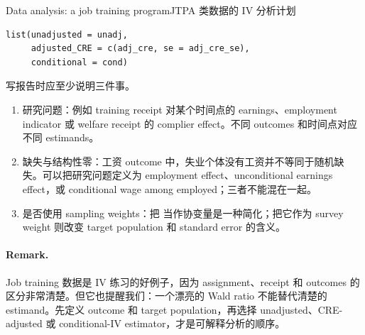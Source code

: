 \begin{exercisesolution}{Data analysis: a job training program}{JTPA 类数据的 IV 分析计划}
\begin{lstlisting}
list(unadjusted = unadj,
     adjusted_CRE = c(adj_cre, se = adj_cre_se),
     conditional = cond)
\end{lstlisting}

写报告时应至少说明三件事。
\begin{enumerate}
\item
研究问题：例如 training receipt 对某个时间点的 earnings、employment indicator 或 welfare receipt 的 complier effect。不同 outcomes 和时间点对应不同 estimands。
\item
缺失与结构性零：工资 outcome 中，失业个体没有工资并不等同于随机缺失。可以把研究问题定义为 employment effect、unconditional earnings effect，或 conditional wage among employed；三者不能混在一起。
\item
是否使用 sampling weights：把  当作协变量是一种简化；把它作为 survey weight 则改变 target population 和 standard error 的含义。
\end{enumerate}

\paragraph{Remark.}
Job training 数据是 IV 练习的好例子，因为 assignment、receipt 和 outcomes 的区分非常清楚。但它也提醒我们：一个漂亮的 Wald ratio 不能替代清楚的 estimand。先定义 outcome 和 target population，再选择 unadjusted、CRE-adjusted 或 conditional-IV estimator，才是可解释分析的顺序。
\end{exercisesolution}
